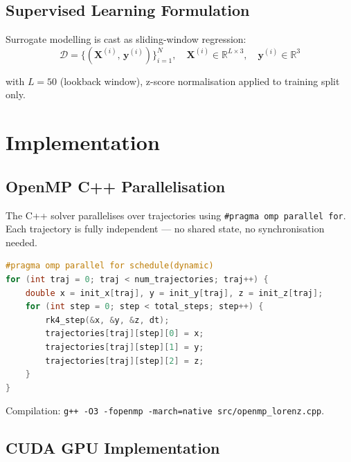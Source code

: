 \documentclass[11pt,a4paper]{article}
\begin{document}
\subsection{Supervised Learning Formulation}

Surrogate modelling is cast as sliding-window regression:
\begin{equation}
  \mathcal{D} = \bigl\{(\mathbf{X}^{(i)},\,\mathbf{y}^{(i)})\bigr\}_{i=1}^{N},
  \quad \mathbf{X}^{(i)} \in \mathbb{R}^{L \times 3},\quad
  \mathbf{y}^{(i)} \in \mathbb{R}^{3}
\end{equation}

with $L=50$ (lookback window), z-score normalisation applied to training split only.

\section{Implementation}

\subsection{OpenMP C++ Parallelisation}

The C++ solver parallelises over trajectories using \texttt{\#pragma omp parallel for}.
Each trajectory is fully independent --- no shared state, no synchronisation needed.

\begin{lstlisting}[language=C++,
  caption={OpenMP parallel trajectory loop --- \texttt{src/openmp\_lorenz.cpp}}]
#pragma omp parallel for schedule(dynamic)
for (int traj = 0; traj < num_trajectories; traj++) {
    double x = init_x[traj], y = init_y[traj], z = init_z[traj];
    for (int step = 0; step < total_steps; step++) {
        rk4_step(&x, &y, &z, dt);
        trajectories[traj][step][0] = x;
        trajectories[traj][step][1] = y;
        trajectories[traj][step][2] = z;
    }
}
\end{lstlisting}

Compilation: \texttt{g++ -O3 -fopenmp -march=native src/openmp\_lorenz.cpp}.

\newpage

\subsection{CUDA GPU Implementation}
\end{document}
